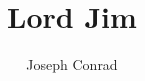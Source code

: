 \documentclass[11pt,twoside,onecolumn,openright,extrafontsizes]{memoir}
\title{Lord Jim}
\author{Joseph Conrad}
\date{}
\begin{document}
	\raggedbottom
    \frontmatter
        
        
        
        
        \cleardoublepage
    \mainmatter
            
            
            
    \backmatter
\end{document}
